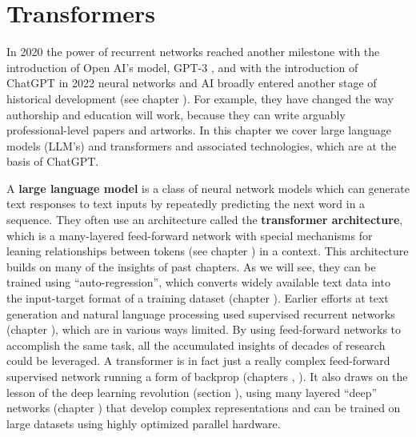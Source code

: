 \chapter{Transformers}\label{ch_transformers}


In 2020 the power of recurrent networks reached another milestone with the introduction of Open AI's model, GPT-3 \cite{brown2020language, floridi2020gpt}, and with the introduction of ChatGPT in 2022 neural networks and AI broadly entered another stage of historical development (see chapter ). For example, they have changed the way authorship and education will work, because they can write arguably professional-level papers and artworks. In this chapter we cover large language models (LLM's) and transformers and associated technologies, which are at the basis of ChatGPT.

A \textbf{large language model} is a class of neural network models which can generate text responses to text inputs by repeatedly predicting the next word in a sequence. They often use an architecture called the \textbf{transformer architecture}, which is a many-layered feed-forward network with special mechanisms for leaning relationships between tokens (see chapter ) in a context.  This architecture builds on many of the insights of past chapters. As we will see, they can be trained using ``auto-regression'', which converts widely available text data into the input-target format of a training dataset (chapter ). Earlier efforts at text generation and natural language processing used supervised recurrent networks (chapter ), which are in various ways limited. By using feed-forward networks to accomplish the same task, all the accumulated insights of decades of research could be leveraged. A transformer is in fact just a really complex feed-forward supervised network running a form of backprop (chapters , ). It also draws on the lesson of the deep learning revolution (section ), using many layered ``deep'' networks (chapter ) that develop complex representations and can be trained on large datasets using highly optimized parallel hardware.

